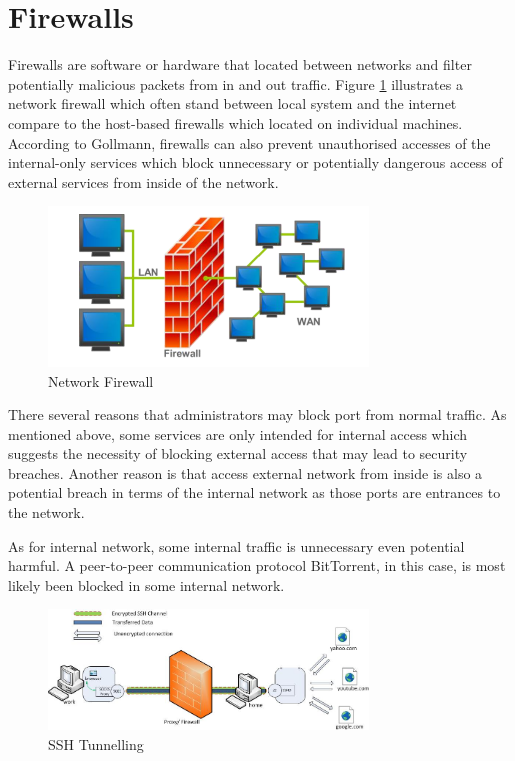 \documentclass{article}
\begin{document}
\section{Firewalls}
\label{sec:firewalls}



Firewalls are software or hardware that located between networks and filter potentially malicious 
packets from in and out traffic\cite{AndersonRoss1956-2008Se:a}.
Figure \ref{firewall} illustrates a network firewall which often stand between local system and 
the internet compare to the host-based firewalls which located on individual machines. 
According to Gollmann, firewalls can also prevent unauthorised accesses of the internal-only services which 
block unnecessary or potentially dangerous access of external services from inside of the network\cite{GollmannDieter2011Cs/D}.

\begin{figure}[H]
  \includegraphics[width=8.5cm]{firewall}
  \caption{Network Firewall}
  \label{firewall}
\end{figure}

There several reasons that administrators may block port from normal traffic. As mentioned above, some services 
are only intended for internal access which suggests the necessity of blocking external access that 
may lead to security breaches. Another reason is that access external network from inside is also a potential 
breach in terms of the internal network as those ports are entrances to the network. 

As for internal network, some internal traffic is unnecessary even potential harmful. A peer-to-peer 
communication protocol BitTorrent, in this case, is most likely been blocked in some internal network.

\begin{figure}[H]
  \includegraphics[width=8.5cm]{ssh}
  \caption{SSH Tunnelling}
  \label{ssh}
\end{figure}
\end{document}
